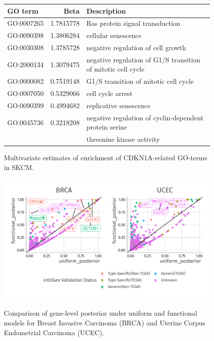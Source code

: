 \begin{figure}
    \centering
\begin{tabular}{l|r|l}
\hline
GO term & Beta & Description\\
\hline
GO:0007265 & 1.7815778 & Ras protein signal transduction\\
\hline
GO:0090398 & 1.3806284 & cellular senescence\\
\hline
GO:0030308 & 1.3785728 & negative regulation of cell growth\\
\hline
GO:2000134 & 1.3079475 & negative regulation of G1/S transition of mitotic cell cycle\\
\hline
GO:0000082 & 0.7519148 & G1/S transition of mitotic cell cycle\\
\hline
GO:0007050 & 0.5329066 & cell cycle arrest\\
\hline
GO:0090399 & 0.4994682 & replicative senescence\\
\hline
  GO:0045736 & 0.3218208 & negative regulation of cyclin-dependent protein serine \\
        & & threonine kinase activity\\
\hline
\end{tabular}
\label{tab:CDKN1A_features}
\caption{Multivariate estimates of enrichment of CDKN1A-related GO-terms in SKCM.}
\end{figure}

\begin{figure}
    \centering
    \includegraphics[width=.9\linewidth]{img/fgem_posterior_plot.png}
    \label{fig:fgem_posterior}
    \caption{Comparison of gene-level posterior under uniform and functional models for  Breast Invasive Carcinoma (BRCA) and Uterine Corpus Endometrial Carcinoma (UCEC).}
\end{figure}

